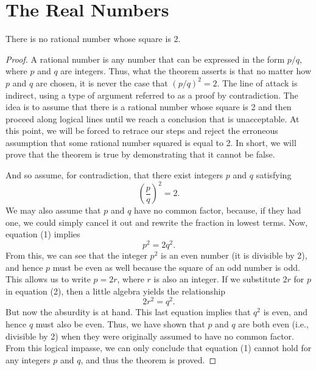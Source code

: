 \chapter{The Real Numbers}
\begin{theorem}
  There is no rational number whose square is $2$.
\end{theorem}

\begin{proof}
  A rational number is any number that can be expressed in the form
  $p/q$, where $p$ and $q$ are integers. Thus, what the theorem
  asserts is that no matter how $p$ and $q$ are chosen, it is never
  the case that $(p/q)^2 = 2$. The line of attack is indirect, using
  a type of argument referred to as a proof by contradiction. The
  idea is to assume that there is a rational number whose square is 2
  and then proceed along logical lines until we reach a conclusion
  that is unacceptable. At this point, we will be forced to retrace
  our steps and reject the erroneous assumption that some rational
  number squared is equal to 2. In short, we will prove that the
  theorem is true by demonstrating that it cannot be false.

  And so assume, for contradiction, that there exist integers $p$ and
  $q$ satisfying
  \[ \left(\frac{p}{q}\right)^2 = 2. \tag{1} \]
  We may also assume that $p$ and $q$ have no common factor, because,
  if they had one, we could simply cancel it out and rewrite the
  fraction in lowest terms. Now, equation (1) implies
  \[ p^2 = 2q^2. \tag{2} \]
  From this, we can see that the integer $p^2$ is an even number (it
  is divisible by 2), and hence $p$ must be even as well because the
  square of an odd number is odd. This allows us to write $p = 2r$,
  where $r$ is also an integer. If we substitute $2r$ for $p$ in
  equation (2), then a little algebra yields the relationship
  \[ 2r^2 = q^2. \]
  But now the absurdity is at hand. This last equation implies that
  $q^2$ is even, and hence $q$ must also be even. Thus, we have shown
  that $p$ and $q$ are both even (i.e., divisible by 2) when they
  were originally assumed to have no common factor. From this logical
  impasse, we can only conclude that equation (1) cannot hold for any
  integers $p$ and $q$, and thus the theorem is proved.
\end{proof}

